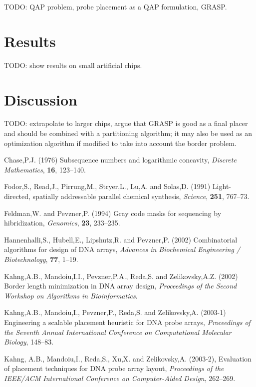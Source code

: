 \documentclass{bioinfo}
\begin{document}
TODO: QAP problem, probe placement as a QAP formulation, GRASP.

\section{Results}

TODO: show results on small artificial chips.

\section{Discussion}

TODO: extrapolate to larger chips, argue that GRASP is good as a final placer and should be combined with a partitioning algorithm; it may also be used as an optimization algorithm if modified to take into account the border problem.

\begin{thebibliography}{}

 Chase,P.J. (1976) Subsequence numbers and logarithmic concavity, {\it Discrete Mathematics}, {\bf 16}, 123--140.

 Fodor,S., Read,J., Pirrung,M., Stryer,L., Lu,A. and Solas,D. (1991) Light-directed, spatially addressable parallel chemical synthesis, {\it Science}, {\bf 251}, 767--73.

 Feldman,W. and Pevzner,P. (1994) Gray code masks for sequencing by hibridization, {\it Genomics}, {\bf 23}, 233--235.

 Hannenhalli,S., Hubell,E., Lipshutz,R. and Pevzner,P. (2002) Combinatorial algorithms for design of DNA arrays, {\it Advances in Biochemical Engineering / Biotechnology}, {\bf 77}, 1--19.

 Kahng,A.B., Mandoiu,I.I., Pevzner,P.A., Reda,S. and Zelikovsky,A.Z. (2002) Border length minimization in DNA array design, {\it Proceedings of the Second Workshop on Algorithms in Bioinformatics}.

 Kahng,A.B., Mandoiu,I., Pevzner,P., Reda,S. and Zelikovsky,A. (2003-1) Engineering a scalable placement heuristic for DNA probe arrays, {\it Proceedings of the Seventh Annual International Conference on Computational Molecular Biology}, 148--83.

 Kahng, A.B., Mandoiu,I., Reda,S., Xu,X. and Zelikovsky,A. (2003-2), Evaluation of placement techniques for DNA probe array layout, {\it Proceedings of the IEEE/ACM International Conference on Computer-Aided Design}, 262--269.

\end{thebibliography}
\end{document}

